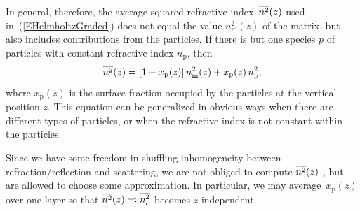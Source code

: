 In general, therefore, the average squared refractive index~$\overline{n^2}(z)$
used in~(\ref{EHelmholtzGraded})
does not equal the value $n_\text{m}^2(z)$ of the matrix,
but also includes contributions from the particles.
If there is but one species $p$ of particles
%
with constant refractive index $n_\text{p}$,
then
\begin{equation}\label{Enzx}
  \overline{n^2}(z) = [1-x_\text{p}(z)]\,n_\text{m}^2(z) + x_\text{p}(z)\, n_\text{p}^2,
\end{equation}
where $x_\text{p}(z)$ is the surface fraction occupied by the particles at
the vertical position $z$.
This equation can be generalized in obvious ways
when there are different types of particles,
or when the refractive index is not constant within the particles.

\mdbreakoff
{}

Since we have some freedom in shuffling inhomogeneity
between refraction/reflection and scattering,
we are not obliged to compute $\overline{n^2}(z)$ ,
but are allowed to choose some approximation.
In particular, we may average~$x_\text{p}(z)$
over one layer
so that $\overline{n^2}(z)\eqqcolon \overline{n_l^2}$ becomes $z$ independent.


